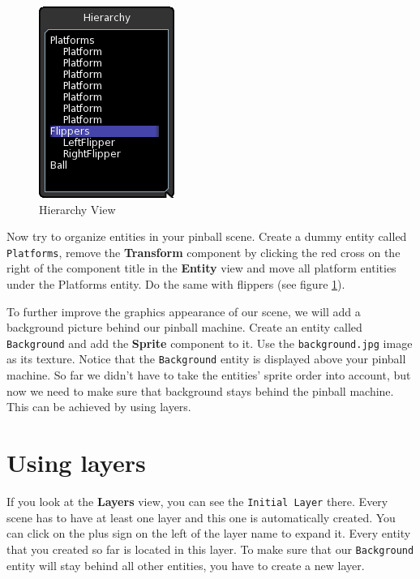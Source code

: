 \documentclass[a4paper,12pt]{article}
\begin{document}
\begin{figure}
\vspace{-20pt}
\capstart
\begin{center}
  \includegraphics[scale=0.65]{Hierarchy}
 \end{center}
 \vspace{-20pt}
 \caption{Hierarchy View}
 \label{fig:hierarchy}
 \vspace{-10pt}
\end{figure}

Now try to organize entities in your pinball scene. Create a dummy entity called \texttt{Platforms}, remove the \textbf{Transform} component by clicking the red cross on the right of the component title in the \textbf{Entity} view and move all platform entities under the Platforms entity. Do the same with flippers (see figure \ref{fig:hierarchy}).

To further improve the graphics appearance of our scene, we will add a background picture behind our pinball machine. Create an entity called \texttt{Background} and add the \textbf{Sprite} component to it. Use the \texttt{background.jpg} image as its texture. Notice that the \texttt{Background} entity is displayed above your pinball machine. So far we didn't have to take the entities' sprite order into account, but now we need to make sure that background stays behind the pinball machine. This can be achieved by using layers.  

\section{Using layers}

If you look at the \textbf{Layers} view, you can see the \texttt{Initial Layer} there. Every scene has to have at least one layer and this one is automatically created. You can click on the plus sign on the left of the layer name to expand it. Every entity that you created so far is located in this layer. To make sure that our \texttt{Background} entity will stay behind all other entities, you have to create a new layer.
\end{document}
